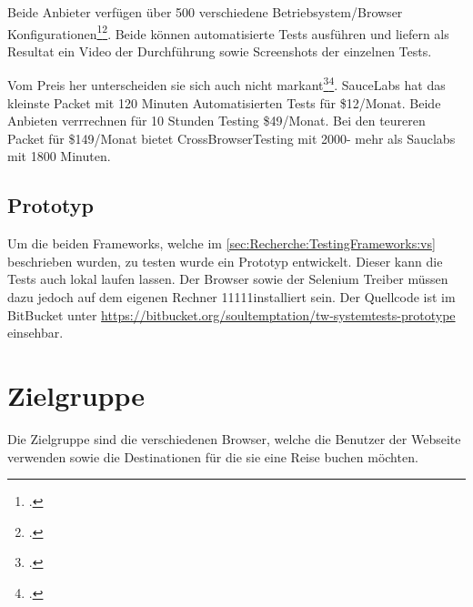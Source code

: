 Beide Anbieter verfügen über 500 verschiedene Betriebsystem/Browser Konfigurationen\footcite{Platforms_2015-07-26}\footcite{OS_Browser_Configurations_for_Cross_Browser_Compatibility_Testing_2015-07-26}. Beide können automatisierte Tests ausführen und liefern als Resultat ein Video der Durchführung sowie Screenshots der einzelnen Tests.

Vom Preis her unterscheiden sie sich auch nicht markant\footcite{Sauce_Labs_Pricing_2015-07-26}\footcite{Test_your_site_on_all_browsers_2015-07-26}. SauceLabs hat das kleinste Packet mit 120 Minuten Automatisierten Tests für \$12/Monat. Beide Anbieten verrrechnen für 10 Stunden Testing \$49/Monat. Bei den teureren Packet für \$149/Monat bietet CrossBrowserTesting mit 2000- mehr als Sauclabs mit 1800 Minuten.

\subsection{Prototyp}
Um die beiden Frameworks, welche im \cref{sec:Recherche:TestingFrameworks:vs}  beschrieben wurden, zu testen wurde ein Prototyp entwickelt. Dieser kann die Tests auch lokal laufen lassen. Der Browser sowie der Selenium Treiber müssen dazu jedoch auf dem eigenen Rechner 	11111installiert sein. Der Quellcode ist im BitBucket unter \url{https://bitbucket.org/soultemptation/tw-systemtests-prototype} einsehbar.

\section{Zielgruppe}
Die Zielgruppe sind die verschiedenen Browser, welche die Benutzer der Webseite verwenden sowie die Destinationen für die sie eine Reise buchen möchten.

